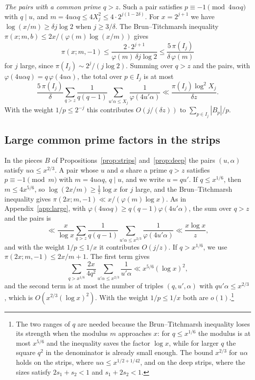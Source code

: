 \documentclass[aps,prd,twocolumn,superscriptaddress,nofootinbib,longbibliography,floatfix,showkeys,nobalancelastpage,amsmath,amssymb,10pt]{revtex4-2}
\theoremstyle{plain}
\theoremstyle{definition}
\theoremstyle{plain}
\begin{document}
\emph{The pairs with a common prime $q>z$.} Such a pair satisfies $p\equiv-1\pmod{4u\alpha q}$ with $q\mid u$, and $m=4u\alpha q\le4X_j^2\le4\cdot2^{j(1-2\delta)}$. For $x=2^{j+1}$ we have $\log(x/m)\ge\delta j\log2$ when $j\ge3/\delta$. The Brun--Titchmarsh inequality $\pi(x;m,b)\le2x/(\varphi(m)\log(x/m))$ \cite{MV} gives
\[
\pi(x;m,-1)\le\frac{2\cdot2^{j+1}}{\varphi(m)\,\delta j\log2}\le\frac{5\,\pi(I_j)}{\delta\,\varphi(m)}
\]
for $j$ large, since $\pi(I_j)\sim2^j/(j\log2)$. Summing over $q>z$ and the pairs, with $\varphi(4u\alpha q)=q\,\varphi(4u\alpha)$, the total over $p\in I_j$ is at most
\[
\frac{5\,\pi(I_j)}\delta\sum_{q>z}\frac1{q(q-1)}\sum_{u'\alpha\le X_j}\frac1{\varphi(4u'\alpha)}\ll\frac{\pi(I_j)\log^2X_j}{\delta z}.
\]
With the weight $1/p\le2^{-j}$ this contributes $O(j/(\delta z))$ to $\sum_{p\in I_j}|B_p|/p$.

\subsection{Large common prime factors in the strips}\label{app:Blarge}

In the pieces $B$ of Propositions~\ref{prop:strips} and~\ref{prop:deep} the pairs $(u,\alpha)$ satisfy $u\alpha\le x^{2/3}$. A pair whose $u$ and $a$ share a prime $q>z$ satisfies $p\equiv-1\pmod m$ with $m=4u\alpha q$, $q\mid u$, and we write $u=qu'$. If $q\le x^{1/6}$, then $m\le4x^{5/6}$, so $\log(2x/m)\ge\frac17\log x$ for $j$ large, and the Brun--Titchmarsh inequality gives $\pi(2x;m,-1)\ll x/(\varphi(m)\log x)$. As in Appendix~\ref{app:large}, with $\varphi(4u\alpha q)\ge q(q-1)\varphi(4u'\alpha)$, the sum over $q>z$ and the pairs is
\[
\ll\frac x{\log x}\sum_{q>z}\frac1{q(q-1)}\sum_{u'\alpha\le x^{2/3}}\frac1{\varphi(4u'\alpha)}\ll\frac{x\log x}z,
\]
and with the weight $1/p\le1/x$ it contributes $O(j/z)$. If $q>x^{1/6}$, we use $\pi(2x;m,-1)\le2x/m+1$. The first term gives
\[
\sum_{q>x^{1/6}}\frac{2x}{4q^2}\sum_{u'\alpha\le x^{2/3}}\frac1{u'\alpha}\ll x^{5/6}(\log x)^2,
\]
and the second term is at most the number of triples $(q,u',\alpha)$ with $qu'\alpha\le x^{2/3}$, which is $O(x^{2/3}(\log x)^2)$. With the weight $1/p\le1/x$ both are $o(1)$.\footnote{The two ranges of $q$ are needed because the Brun--Titchmarsh inequality loses its strength when the modulus $m$ approaches $x$: for $q\le x^{1/6}$ the modulus is at most $x^{5/6}$ and the inequality saves the factor $\log x$, while for larger $q$ the square $q^2$ in the denominator is already small enough. The bound $x^{2/3}$ for $u\alpha$ holds on the strips, where $u\alpha\le x^{1/2+1/42}$, and on the deep strips, where the sizes satisfy $2s_1+s_2<1$ and $s_1+2s_2<1$.}
\end{document}
